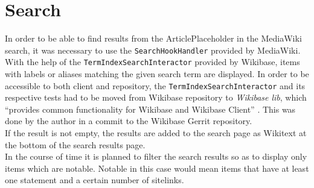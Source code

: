 \section{Search}
In order to be able to find results from the ArticlePlaceholder in the MediaWiki search, it was necessary to use the \texttt{\justify SearchHookHandler} provided by MediaWiki. \citep{wiki:25} \\
With the help of the \texttt{\justify TermIndexSearchInteractor} provided by Wikibase, items with labels or aliases matching the given search term are displayed. In order to be accessible to both client and repository, the \texttt{\justify TermIndexSearchInteractor} and its respective tests had to be moved from Wikibase repository to \textit{Wikibase lib}, which ``provides common functionality for Wikibase and Wikibase Client'' \citep{wiki:28}. This was done by the author in a commit to the Wikibase Gerrit repository. \citep{gerrit:01}
\\
If the result is not empty, the results are added to the search page as Wikitext at the bottom of the search results page. \\
In the course of time it is planned to filter the search results so as to display only items which are notable. Notable in this case would mean items that have at least one statement and a certain number of sitelinks.
